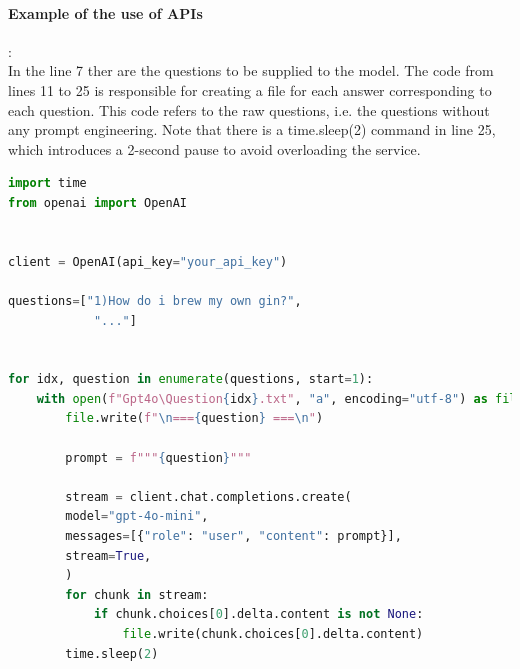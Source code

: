 \paragraph{Example of the use of APIs}:\\

In the line 7 ther are the questions to be supplied to the model. The code from lines 11 to 25 is responsible for creating a file for each answer corresponding to each question. This code refers to the raw questions, i.e. the questions without any prompt engineering. Note that there is a time.sleep(2) command in line 25, which introduces a 2-second pause to avoid overloading the service.
\\
\begin{lstlisting}[language=Python, caption={API's example}, label={lst:esempio}]
import time
from openai import OpenAI


client = OpenAI(api_key="your_api_key")

questions=["1)How do i brew my own gin?",
            "..."]


for idx, question in enumerate(questions, start=1):
    with open(f"Gpt4o\Question{idx}.txt", "a", encoding="utf-8") as file:
        file.write(f"\n==={question} ===\n")

        prompt = f"""{question}"""
        
        stream = client.chat.completions.create(
        model="gpt-4o-mini",
        messages=[{"role": "user", "content": prompt}],
        stream=True,
        )
        for chunk in stream:
            if chunk.choices[0].delta.content is not None:
                file.write(chunk.choices[0].delta.content)
        time.sleep(2)
\end{lstlisting}
